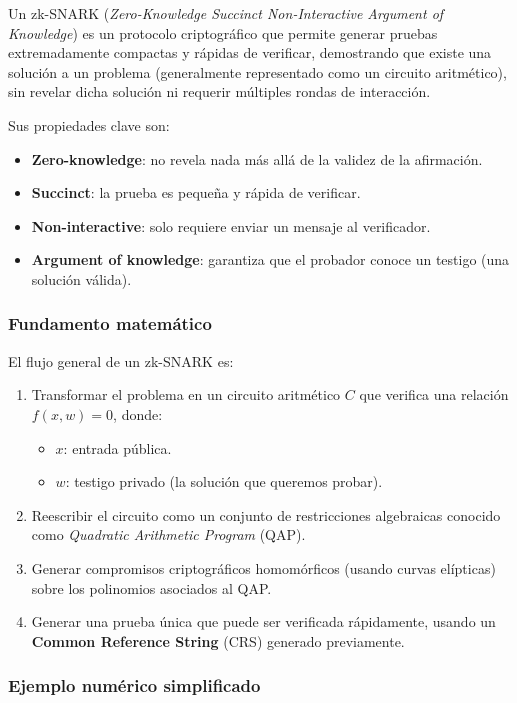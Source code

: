 \documentclass{article}
\begin{document}
Un zk-SNARK (\textit{Zero-Knowledge Succinct Non-Interactive Argument of Knowledge}) es un protocolo criptográfico que permite generar pruebas extremadamente compactas y rápidas de verificar, demostrando que existe una solución a un problema (generalmente representado como un circuito aritmético), sin revelar dicha solución ni requerir múltiples rondas de interacción.

Sus propiedades clave son:
\begin{itemize}
    \item \textbf{Zero-knowledge}: no revela nada más allá de la validez de la afirmación.
    \item \textbf{Succinct}: la prueba es pequeña y rápida de verificar.
    \item \textbf{Non-interactive}: solo requiere enviar un mensaje al verificador.
    \item \textbf{Argument of knowledge}: garantiza que el probador conoce un testigo (una solución válida).
\end{itemize}

\subsubsection{Fundamento matemático}

El flujo general de un zk-SNARK es:
\begin{enumerate}
    \item Transformar el problema en un circuito aritmético \( C \) que verifica una relación \( f(x, w) = 0 \), donde:
        \begin{itemize}
            \item \( x \): entrada pública.
            \item \( w \): testigo privado (la solución que queremos probar).
        \end{itemize}
    \item Reescribir el circuito como un conjunto de restricciones algebraicas conocido como \textit{Quadratic Arithmetic Program} (QAP).
    \item Generar compromisos criptográficos homomórficos (usando curvas elípticas) sobre los polinomios asociados al QAP.
    \item Generar una prueba única que puede ser verificada rápidamente, usando un \textbf{Common Reference String} (CRS) generado previamente.
\end{enumerate}

\subsubsection{Ejemplo numérico simplificado}
\end{document}
